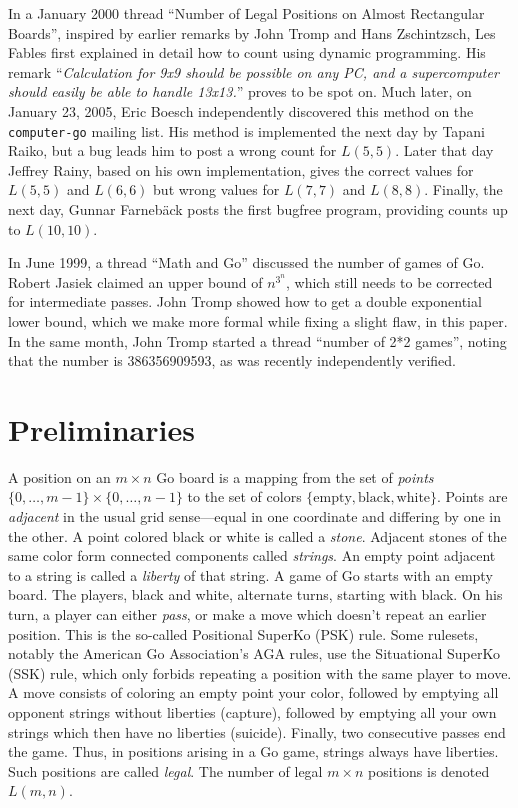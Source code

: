 \documentclass{article}
\begin{document}
In a January 2000 thread
``Number of Legal Positions on Almost Rectangular Boards'',
inspired by earlier remarks by John Tromp and Hans Zschintzsch,
Les Fables first explained in detail how to count using dynamic programming.
His remark ``{\it Calculation for 9x9 should be possible on any PC,
and a supercomputer should easily be able to handle 13x13.}''
proves to be spot on.
Much later, on January 23, 2005, Eric Boesch independently discovered
this method on the {\tt computer-go} mailing list. His method is
implemented the next day by Tapani Raiko, but a bug leads him to post a wrong
count for $L(5,5)$. Later that day Jeffrey Rainy,
based on his own implementation, gives the correct values for
$L(5,5)$ and $L(6,6)$ but wrong values for $L(7,7)$ and $L(8,8)$.
Finally, the next day, Gunnar Farneb\"{a}ck posts the first bugfree program,
providing counts up to $L(10,10)$.

In June 1999, a thread ``Math and Go''
discussed the number of games
of Go. Robert Jasiek claimed an upper bound of $n^{3^n}$, which still
needs to be corrected for intermediate passes. John Tromp showed
how to get a double exponential lower bound, which we make more formal
while fixing a slight flaw, in this paper.
In the same month, John Tromp started a thread ``number of 2*2 games'',
noting that the number is 386356909593, as was recently independently
verified.


\section{Preliminaries}
A position on an $m\times n$ Go board is a
mapping from the set of {\em points}
$\{0,\ldots,m-1\}\times \{0,\ldots,n-1\}$ to the set of colors
$\{\mbox{empty}, \mbox{black}, \mbox{white}\}$.
Points are {\em adjacent} in the usual grid sense---equal
in one coordinate and differing by one in the other.
A point colored black or white is called a {\em stone}.
Adjacent stones of the same color form connected components
called {\em strings}. An empty point adjacent to a string is called a
{\em liberty} of that string.
A game of Go starts with an empty board. The players, black and white,
alternate turns, starting with black.
On his turn, a player can either {\em pass}, or make a move which doesn't
repeat an earlier position.
This is the so-called Positional SuperKo (PSK) rule. Some rulesets,
notably the American Go Association's AGA rules, use the Situational
SuperKo (SSK) rule, which only forbids repeating a position with
the same player to move.
A move consists of coloring an empty point your color, followed by
emptying all opponent strings without liberties (capture), followed by
emptying all your own strings which then have no liberties (suicide).
Finally, two consecutive passes end the game.
Thus, in positions arising in a Go game,
strings always have liberties. Such positions are called {\em legal}.
The number of legal $m \times n$ positions is denoted $L(m,n)$.
\end{document}
